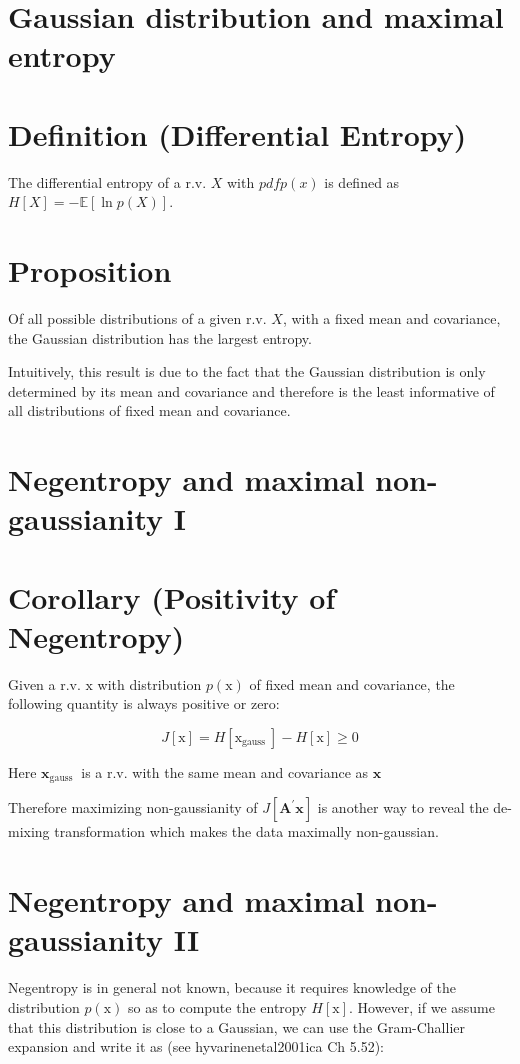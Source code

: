 \documentclass[11pt]{article}
\theoremstyle{plain} %
\theoremstyle{remark}
\begin{document}
\section*{Gaussian distribution and maximal entropy}
\section*{Definition (Differential Entropy)}
The differential entropy of a r.v. $X$ with $p d f p(x)$ is defined as
$H[X]=-\mathbb{E}[\ln p(X)]$.

\section*{Proposition}
Of all possible distributions of a given r.v. $X$, with a fixed mean and
covariance, the Gaussian distribution has the largest entropy.

Intuitively, this result is due to the fact that the Gaussian distribution is
only determined by its mean and covariance and therefore is the least
informative of all distributions of fixed mean and covariance.

\section*{Negentropy and maximal non-gaussianity I}
\section*{Corollary (Positivity of Negentropy)}
Given a r.v. $\mathrm{x}$ with distribution $p(\mathrm{x})$ of fixed mean and
covariance, the following quantity is always positive or zero:

$$
J[\mathrm{x}]=H\left[\mathrm{x}_{\text {gauss }}\right]-H[\mathrm{x}] \geq 0
$$

Here $\mathbf{x}_{\text {gauss }}$ is a r.v. with the same mean and covariance
as $\mathbf{x}$

Therefore maximizing non-gaussianity of $J\left[\mathbf{A}^{\prime}
\mathbf{x}\right]$ is another way to reveal the de-mixing transformation which
makes the data maximally non-gaussian.

\section*{Negentropy and maximal non-gaussianity II}
Negentropy is in general not known, because it requires knowledge of the
distribution $p(\mathrm{x})$ so as to compute the entropy $H[\mathrm{x}]$.
However, if we assume that this distribution is close to a Gaussian, we can use
the Gram-Challier expansion and write it as (see hyvarinenetal2001ica Ch 5.52):
\end{document}
